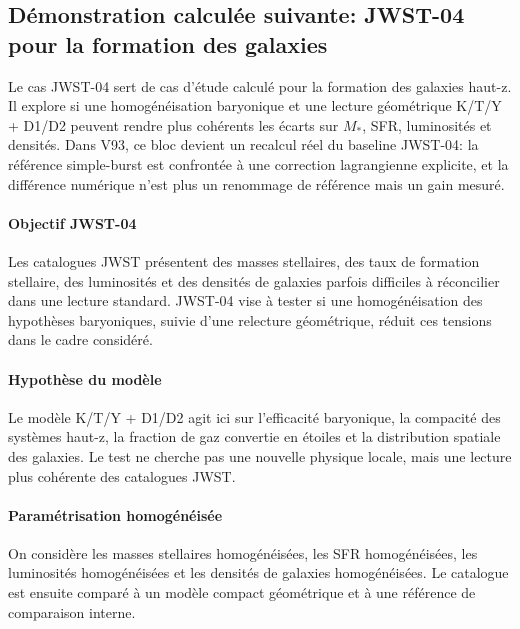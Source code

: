 \documentclass[11pt,a4paper]{article}
\begin{document}


\subsection{Démonstration calculée suivante: JWST-04 pour la formation des galaxies}
Le cas JWST-04 sert de cas d'étude calculé pour la formation des galaxies haut-z. Il explore si une homogénéisation baryonique et une lecture géométrique K/T/Y + D1/D2 peuvent rendre plus cohérents les écarts sur $M_*$, SFR, luminosités et densités.
Dans V93, ce bloc devient un recalcul réel du baseline JWST-04: la référence simple-burst est confrontée à une correction lagrangienne explicite, et la différence numérique n'est plus un renommage de référence mais un gain mesuré.

\paragraph{Objectif JWST-04}
Les catalogues JWST présentent des masses stellaires, des taux de formation stellaire, des luminosités et des densités de galaxies parfois difficiles à réconcilier dans une lecture standard. JWST-04 vise à tester si une homogénéisation des hypothèses baryoniques, suivie d'une relecture géométrique, réduit ces tensions dans le cadre considéré.

\paragraph{Hypothèse du modèle}
Le modèle K/T/Y + D1/D2 agit ici sur l'efficacité baryonique, la compacité des systèmes haut-z, la fraction de gaz convertie en étoiles et la distribution spatiale des galaxies. Le test ne cherche pas une nouvelle physique locale, mais une lecture plus cohérente des catalogues JWST.

\paragraph{Paramétrisation homogénéisée}
On considère les masses stellaires homogénéisées, les SFR homogénéisées, les luminosités homogénéisées et les densités de galaxies homogénéisées. Le catalogue est ensuite comparé à un modèle compact géométrique et à une référence de comparaison interne.
\end{document}
